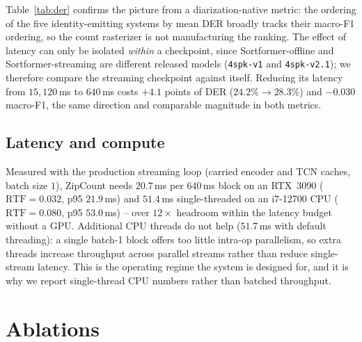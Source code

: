 \documentclass[journal]{IEEEtran}
\newcommand{\sys}{ZipCount}
\begin{document}
Table~\ref{tab:der} confirms the picture from a diarization-native metric:
the ordering of the five identity-emitting systems by mean DER broadly
tracks their macro-F1 ordering, so the count rasterizer is not manufacturing
the ranking. The effect of latency can only be isolated \emph{within} a
checkpoint, since Sortformer-offline and Sortformer-streaming are different
released models (\texttt{4spk-v1} and \texttt{4spk-v2.1}); we therefore
compare the streaming checkpoint against itself. Reducing its latency from
$15{,}120$\,ms to $640$\,ms costs $+4.1$ points of DER
($24.2\% \rightarrow 28.3\%$) and $-0.030$ macro-F1, the same direction and
comparable magnitude in both metrics.

\subsection{Latency and compute}
Measured with the production streaming loop (carried encoder and TCN caches,
batch size $1$), \sys{} needs $20.7$\,ms per $640$\,ms block on an
RTX~3090 ($\mathrm{RTF}=0.032$, p95 $21.9$\,ms) and $51.4$\,ms
single-threaded on an i7-12700 CPU ($\mathrm{RTF}=0.080$, p95 $53.0$\,ms) --
over $12\times$ headroom within the latency budget without a GPU. Additional
CPU threads do not help ($51.7$\,ms with default threading): a single
batch-1 block offers too little intra-op parallelism, so extra threads
increase throughput across parallel streams rather than reduce single-stream
latency. This is the operating regime the system is designed for, and it is
why we report single-thread CPU numbers rather than batched throughput.

\section{Ablations}
\label{sec:ablation}
\end{document}
